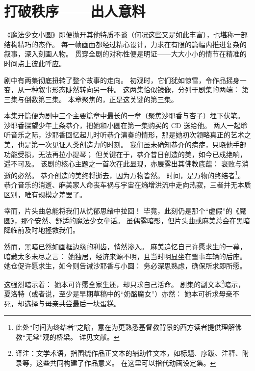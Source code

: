 \chapter[打破秩序——出人意料]{打破秩序——出人意料}



《魔法少女小圆》即便抛开其他特质不谈（何况这些又是如此丰富），也堪称一部结构精巧的杰作。
每一帧画面都经过精心设计，力求在有限的篇幅内推进复杂的叙事，深入刻画人物。
贯穿全剧的对称性便是明证——大大小小的情节在精准的时间点上彼此呼应。

剧中有两集彻底扭转了整个故事的走向。
初观时，它们犹如惊雷，令作品摇身一变，从一种叙事形态陡然转向另一种。
这两集恰似镜像，分列于剧集的两端：
第三集与倒数第三集。
本章聚焦的，正是这关键的第三集。

本集开篇便为剧中三个主要篇章中最长的一章（聚焦沙耶香与杏子）埋下伏笔。
沙耶香探望少年上条恭介，把她和小圆在第一集购买的 CD 送给他。
两人一起聆听音乐之际，沙耶香回忆起儿时听恭介演奏的情形，那是她初次领略真正的艺术之美，也是第一次见证人类创造力的时刻。
我们虽未确知恭介的病症，只晓他手部功能受损，无法再拉小提琴；
但关键在于，恭介昔日创造的美，如今已成绝响，遥不可及。
该剧的核心主题之一首次在此显现，亦展露出其佛教底蕴：
衰败与消逝的必然。
恭介创造的美终将逝去，因为万物皆然。
时间，是万物的终结者\footnote{%
    此处“时间为终结者”之喻，意在为更熟悉基督教背景的西方读者提供理解佛教“无常”观的桥梁。
    详见文献\cite{ref25}。
}。
恭介音乐的消逝、麻美家人命丧车祸与宇宙在熵增洪流中走向热寂，三者并无本质区别，唯有规模之差罢了。

幸而，片头曲总能将我们从忧郁思绪中拉回！
毕竟，此刻仍是那个“虚假”的《魔圆》，那个安然、舒适的魔法少女童话。
虽偶露暗影，但片头曲或麻美总会在黑暗降临前及时地拯救我们。

然而，黑暗已然如画框边缘的利齿，悄然渗入。
麻美追忆自己许愿求生的一幕，暗藏太多未尽之言：
她独居，经济来源不明，且当时明显坐在肇事车辆的后座。
她仓促许愿求生，如今则告诫沙耶香与小圆：
务必深思熟虑，确保所求即所愿。

这强烈暗示着：
她本可许愿全家生还，却只求自己活命。
剧集的副文本\footnote{%
    译注：文学术语，指围绕作品正文本的辅助性文本，如标题、序跋、注释、附录等，这些共同构建了作品意义。
    在这里可以指代动画设定集。
}暗示，夏洛特（或者说，至少是早期草稿中的“奶酪魔女”）亦然：
她本可祈求母亲不死，却选择与母亲共尝最后一块蛋糕\cite{ref26}。


